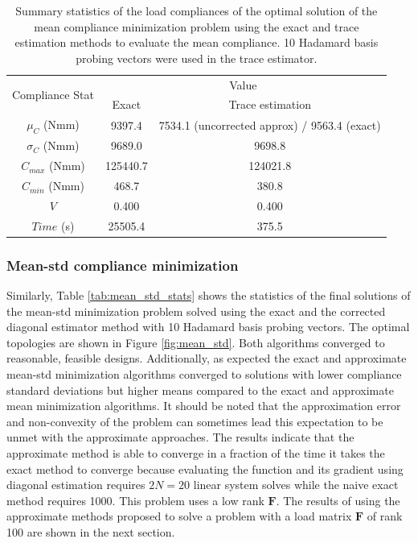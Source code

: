 \begin{table}
 \centering
 \caption{Summary statistics of the load compliances of the optimal solution of the mean compliance minimization problem using the exact and trace estimation methods to evaluate the mean compliance. 10 Hadamard basis probing vectors were used in the trace estimator.}
 \begin{tabular}{|c|c|c|}
  \hline
  \multirow{2}{5em}{Compliance Stat} & \multicolumn{2}{c|}{Value} \\\cline{2-3}
  & Exact & Trace estimation \\
  \hline
  \hline
  $\mu_C$ (Nmm) & 9397.4 & 7534.1 (uncorrected approx) / 9563.4 (exact) \\
  \hline
  $\sigma_C$ (Nmm) & 9689.0 & 9698.8 \\
  \hline
  $C_{max}$ (Nmm) & 125440.7 & 124021.8 \\
  \hline
  $C_{min}$ (Nmm) & 468.7 & 380.8 \\
  \hline
  $V$ & 0.400 & 0.400 \\
  \hline
  $Time$ (s) & 25505.4 & 375.5 \\
  \hline
 \end{tabular}
 \label{tab:mean_stats}
\end{table}

\subsubsection{Mean-std compliance minimization}

Similarly, Table \ref{tab:mean_std_stats} shows the statistics of the final solutions of the mean-std minimization problem solved using the exact and the corrected diagonal estimator method with 10 Hadamard basis probing vectors. The optimal topologies are shown in Figure \ref{fig:mean_std}. Both algorithms converged to reasonable, feasible designs. Additionally, as expected the exact and approximate mean-std minimization algorithms converged to solutions with lower compliance standard deviations but higher means compared to the exact and approximate mean minimization algorithms. It should be noted that the approximation error and non-convexity of the problem can sometimes lead this expectation to be unmet with the approximate approaches. The results indicate that the approximate method is able to converge in a fraction of the time it takes the exact method to converge because evaluating the function and its gradient using diagonal estimation requires $2N = 20$ linear system solves while the naive exact method requires 1000. This problem uses a low rank $\bm{F}$. The results of using the approximate methods proposed to solve a problem with a load matrix $\bm{F}$ of rank 100 are shown in the next section.


